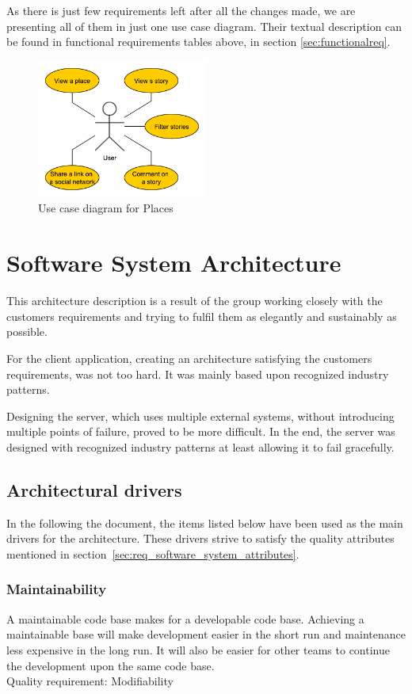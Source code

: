 \documentclass[11pt]{book}
\begin{document}
As there is just few requirements left after all the changes made, we are presenting all of them in just one use case diagram. Their textual description can be found in functional requirements tables above, in section \ref{sec:functionalreq}.

\begin{figure}[H]
      \centering
      \includegraphics[width=0.5\textwidth]{Figures/Requirements/final.pdf}
      \caption{Use case diagram for Places}
      \label{fig:req_usecase_walls}
\end{figure}

\chapter{Software System Architecture}\label{chap:architecture}
This architecture description is a result of the group working closely with the customers requirements and trying to fulfil them as elegantly and sustainably as possible.

For the client application, creating an architecture satisfying the customers requirements, was not too hard. It was  mainly based upon recognized industry patterns.

Designing the server, which uses multiple external systems, without introducing multiple points of failure, proved to be more difficult. In the end, the server was designed with recognized industry patterns at least allowing it to fail gracefully.

\section{Architectural drivers} \label{sec:architecture_drivers}
In the following the document, the items listed below have been used as the main drivers for the architecture. These drivers strive to satisfy the quality attributes mentioned in section~\ref{sec:req_software_system_attributes}.

\subsection{Maintainability} 
A maintainable code base makes for a developable code base. Achieving a maintainable base will make development easier in the short run and maintenance less expensive in the long run. It will also be easier for other teams to continue the development upon the same code base.\\
Quality requirement: Modifiability
\end{document}
